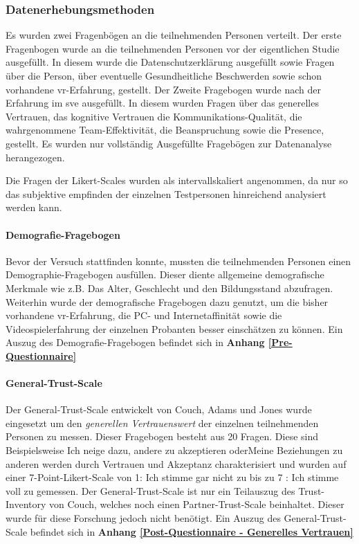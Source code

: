 \documentclass[a4paper,11pt]{article}%
\renewcommand{\\}{\vspace*{0.5\baselineskip} \newline}
\begin{document}
			\subsubsection{Datenerhebungsmethoden}
Es wurden zwei Fragenbögen an die teilnehmenden Personen verteilt. Der erste Fragenbogen wurde an die teilnehmenden Personen vor der eigentlichen Studie ausgefüllt. In diesem wurde die Datenschutzerklärung ausgefüllt sowie Fragen über die \dq{}Person\dq{}, über eventuelle \dq{}Gesundheitliche Beschwerden\dq{} sowie schon vorhandene \dq{}\ac{vr}-Erfahrung\dq{}, gestellt. Der Zweite Fragebogen wurde nach der Erfahrung im \ac{sve} ausgefüllt. In diesem wurden Fragen über das \dq{}generelles Vertrauen\dq{}, das \dq{}kognitive Vertrauen\dq{} die \dq{}Kommunikations-Qualität\dq{}, die wahrgenommene \dq{}Team-Effektivität\dq{}, die \dq{}Beanspruchung\dq{} sowie die \dq{}Presence\dq{}, gestellt.
Es wurden nur vollständig Ausgefüllte Fragebögen zur Datenanalyse herangezogen.\\

Die Fragen der Likert-Scales wurden als intervallskaliert angenommen, da nur so das subjektive empfinden der einzelnen Testpersonen hinreichend analysiert werden kann.
				
		\paragraph{Demografie-Fragebogen}
Bevor der Versuch stattfinden konnte, mussten die teilnehmenden Personen einen Demographie-Fragebogen ausfüllen. Dieser diente allgemeine demografische Merkmale wie z.B. Das Alter, Geschlecht und den Bildungsstand abzufragen. Weiterhin wurde der demografische Fragebogen dazu genutzt, um die bisher vorhandene \ac{vr}-Erfahrung, die PC- und Internetaffinität sowie die Videospielerfahrung der einzelnen Probanten besser einschätzen zu können.
Ein Auszug des Demografie-Fragebogen befindet sich in \textbf{Anhang \ref{Pre-Questionnaire}}

		\paragraph{General-Trust-Scale}
Der General-Trust-Scale entwickelt von Couch, Adams und Jones \citep{couch1996assessment} wurde eingesetzt um den  \textit{generellen Vertrauenswert} der einzelnen teilnehmenden Personen zu messen.
Dieser Fragebogen besteht aus 20 Fragen. Diese sind Beispielsweise \dq{}Ich neige dazu, andere zu akzeptieren \dq{} oder\dq{}Meine Beziehungen zu anderen werden durch Vertrauen und Akzeptanz charakterisiert \dq{} und wurden auf einer 7-Point-Likert-Scale von \dq{}1: Ich stimme gar nicht zu\dq{} bis zu \dq{}7 : Ich stimme voll zu\dq{} gemessen. Der General-Trust-Scale ist nur ein Teilauszug des \dq{}Trust-Inventory von Couch\dq{}, welches noch einen \dq{}Partner-Trust-Scale \dq{} beinhaltet. Dieser wurde für diese Forschung jedoch nicht benötigt. 
Ein Auszug des General-Trust-Scale befindet sich in \textbf{Anhang \ref{Post-Questionnaire - Generelles Vertrauen}}
\end{document}
